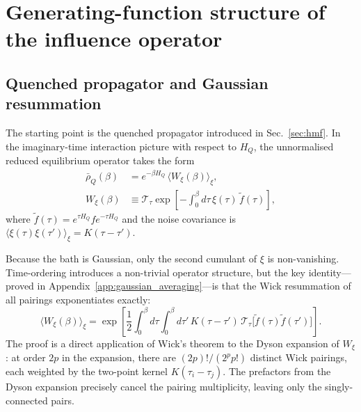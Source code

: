 \section{Generating-function structure of the influence operator\label{sec:generating_function}}

\subsection{Quenched propagator and Gaussian resummation\label{subsec:gaussian_resum}}

The starting point is the quenched propagator introduced in Sec.~\ref{sec:hmf}. In the imaginary-time
interaction picture with respect to $H_Q$, the unnormalised reduced equilibrium operator takes the form
\begin{equation}
    \begin{split}
        \bar\rho_Q(\beta)
        & = e^{-\beta H_Q}\,\langle W_\xi(\beta)\rangle_\xi, \\
        W_\xi(\beta)
        & \equiv \mathcal{T}_\tau\exp\!\left[-\int_0^\beta\!d\tau\,\xi(\tau)\,\tilde f(\tau)\right],
    \end{split}
    \label{eq:Wxi_rhobar_def}
\end{equation}
where $\tilde f(\tau)=e^{\tau H_Q}fe^{-\tau H_Q}$ and the noise covariance is
$\langle\xi(\tau)\xi(\tau')\rangle_\xi = K(\tau-\tau')$.

Because the bath is Gaussian, only the second cumulant of $\xi$ is non-vanishing. Time-ordering
introduces a non-trivial operator structure, but the key identity---proved in
Appendix~\ref{app:gaussian_averaging}---is that the Wick resummation of all pairings exponentiates
exactly:
\begin{equation}
    \langle W_\xi(\beta)\rangle_\xi
    = \exp\!\left[\frac{1}{2}\int_0^\beta\!d\tau\int_0^\beta\!d\tau'\,
      K(\tau-\tau')\,\mathcal{T}_\tau\!\big[\tilde f(\tau)\tilde f(\tau')\big]\right].
    \label{eq:Wbar_cumulant}
\end{equation}
The proof is a direct application of Wick's theorem to the Dyson expansion of $W_\xi$: at
order $2p$ in the expansion, there are $(2p)!/(2^p p!)$ distinct Wick pairings, each weighted
by the two-point kernel $K(\tau_i-\tau_j)$. The prefactors from the Dyson expansion precisely
cancel the pairing multiplicity, leaving only the singly-connected pairs. 

